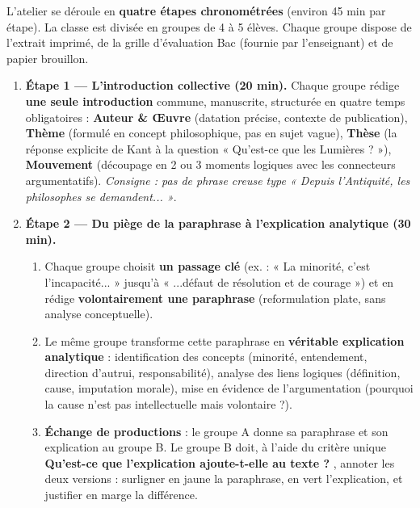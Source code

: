 \documentclass[11pt]{article}
\newcounter{popsec}
\newcounter{popsub}
\newcommand{\courssub}[1]{%
  \stepcounter{popsub}%
  \par\vspace{9pt}\noindent{\popxbold\fontsize{11.5}{13}\selectfont\color{popink}{\color{poporange}\thepopsec.\thepopsub}\hspace{6pt}#1}\par\nopagebreak\vspace{4pt}
}
\begin{document}
\courssub{Consignes}
L'atelier se déroule en \textbf{quatre étapes chronométrées} (environ 45 min par étape). La classe est divisée en groupes de 4 à 5 élèves. Chaque groupe dispose de l'extrait imprimé, de la grille d'évaluation Bac (fournie par l'enseignant) et de papier brouillon.

\begin{enumerate}
    \item \textbf{Étape 1 — L'introduction collective (20 min).} Chaque groupe rédige \textbf{une seule introduction} commune, manuscrite, structurée en quatre temps obligatoires : \textbf{Auteur \& Œuvre} (datation précise, contexte de publication), \textbf{Thème} (formulé en concept philosophique, pas en sujet vague), \textbf{Thèse} (la réponse explicite de Kant à la question « Qu'est-ce que les Lumières ? »), \textbf{Mouvement} (découpage en 2 ou 3 moments logiques avec les connecteurs argumentatifs). \textit{Consigne : pas de phrase creuse type « Depuis l'Antiquité, les philosophes se demandent... »}.
    
    \item \textbf{Étape 2 — Du piège de la paraphrase à l'explication analytique (30 min).}
    \begin{enumerate}
        \item[A.] Chaque groupe choisit \textbf{un passage clé} (ex. : « La minorité, c'est l'incapacité... » jusqu'à « ...défaut de résolution et de courage ») et en rédige \textbf{volontairement une paraphrase} (reformulation plate, sans analyse conceptuelle).
        \item[B.] Le même groupe transforme cette paraphrase en \textbf{véritable explication analytique} : identification des concepts (minorité, entendement, direction d'autrui, responsabilité), analyse des liens logiques (définition, cause, imputation morale), mise en évidence de l'argumentation (pourquoi la cause n'est pas intellectuelle mais volontaire ?).
        \item[C.] \textbf{Échange de productions} : le groupe A donne sa paraphrase et son explication au groupe B. Le groupe B doit, à l'aide du critère unique \guillemotleft \textbf{Qu'est-ce que l'explication ajoute-t-elle au texte ?} \guillemotright, annoter les deux versions : surligner en jaune la paraphrase, en vert l'explication, et justifier en marge la différence.
    \end{enumerate}
    

\end{enumerate}
\end{document}
